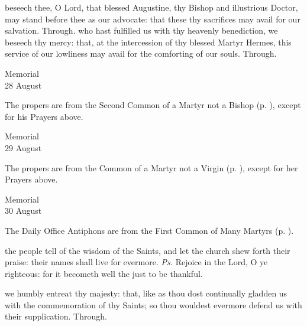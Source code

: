 \postcommunion
{} beseech thee, O Lord, that blessed Augustine, thy Bishop and illustrious Doctor, may stand before thee as our advocate: that these thy sacrifices may avail for our salvation. Through.
 who hast fulfilled us with thy heavenly benediction, we beseech thy mercy: that, at the intercession of thy blessed Martyr Hermes, this service of our lowliness may avail for the comforting of our souls. Through.

\begin{inhead}
    {Memorial\\
28 August}
\end{inhead}

\begin{rubric}
	The propers are from the Second Common of a Martyr not a Bishop (p. \pageref{CommonMartyrNotBishopII}), except for his Prayers above.
\end{rubric}

\begin{inhead}
    {Memorial\\
29 August}
\end{inhead}

\begin{rubric}
	The propers are from the Common of a Martyr not a Virgin (p. \pageref{CommonMartyrNotVirgin}), except for her Prayers above.
\end{rubric}

\begin{inhead}
    {Memorial\\
30 August}
\end{inhead}

\begin{rubric}
	The Daily Office Antiphons are from the First Common of Many Martyrs (p. \pageref{CommonMartyrsI}).
\end{rubric}

\introit
{} the people tell of the wisdom of the Saints, and let the church shew forth their praise: their names shall live for evermore. \textit{Ps.} Rejoice in the Lord, O ye righteous: for it becometh well the just to be thankful.

\collect
{} we humbly entreat thy majesty: that, like as thou dost continually gladden us with the commemoration of thy Saints; so thou wouldest evermore defend us with their supplication. Through.

